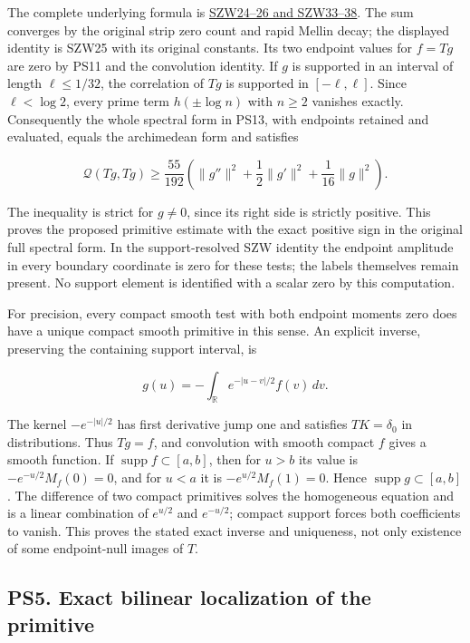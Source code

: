 \documentclass[
  10pt,
  a4paper,
]{article}
\begin{document}
The complete underlying formula is
\href{https://github.com/KokunoYumeto/zeta-function-research-reader/blob/76f421965914beb133df797835f940849844dc4f/workbenches/splitzero-tandem/branches/tau-zero-prime-positivity/SUPPORTED_ZERO_PRIME_WEIL_DERIVATION.md}{SZW24--26
and SZW33--38}. The sum converges by the original strip zero count and
rapid Mellin decay; the displayed identity is SZW25 with its original
constants. Its two endpoint values for \(f=Tg\) are zero by PS11 and the
convolution identity. If \(g\) is supported in an interval of length
\(\ell\le1/32\), the correlation of \(Tg\) is supported in
\([-\ell,\ell]\). Since \(\ell<\log2\), every prime term
\(h(\pm\log n)\) with \(n\ge2\) vanishes exactly. Consequently the whole
spectral form in PS13, with endpoints retained and evaluated, equals the
archimedean form and satisfies

\[
\boxed{\mathcal Q(Tg,Tg)\ge\frac{55}{192}
\left(\|g''\|^2+\frac12\|g'\|^2
+\frac1{16}\|g\|^2\right).}
\tag{PS14}
\]

The inequality is strict for \(g\ne0\), since its right side is strictly
positive. This proves the proposed primitive estimate with the exact
positive sign in the original full spectral form. In the
support-resolved SZW identity the endpoint amplitude in every boundary
coordinate is zero for these tests; the labels themselves remain
present. No support element is identified with a scalar zero by this
computation.

For precision, every compact smooth test with both endpoint moments zero
does have a unique compact smooth primitive in this sense. An explicit
inverse, preserving the containing support interval, is

\[
g(u)=-\int_{\mathbb R}e^{-|u-v|/2}f(v)\,dv.
\tag{PS15}
\]

The kernel \(-e^{-|u|/2}\) has first derivative jump one and satisfies
\(TK=\delta_0\) in distributions. Thus \(Tg=f\), and convolution with
smooth compact \(f\) gives a smooth function. If
\(\operatorname{supp}f\subset[a,b]\), then for \(u>b\) its value is
\(-e^{-u/2}M_f(0)=0\), and for \(u<a\) it is \(-e^{u/2}M_f(1)=0\). Hence
\(\operatorname{supp}g\subset[a,b]\). The difference of two compact
primitives solves the homogeneous equation and is a linear combination
of \(e^{u/2}\) and \(e^{-u/2}\); compact support forces both
coefficients to vanish. This proves the stated exact inverse and
uniqueness, not only existence of some endpoint-null images of \(T\).

\subsection{PS5. Exact bilinear localization of the
primitive}\label{ps5.-exact-bilinear-localization-of-the-primitive}
\end{document}
